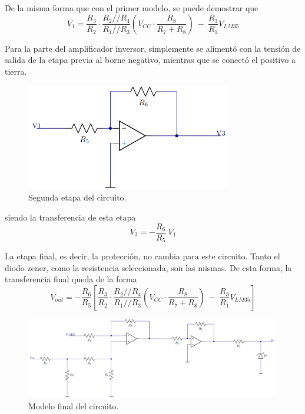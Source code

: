 \documentclass[a4paper]{article}
\begin{document}
De la misma forma que con el primer modelo, se puede demostrar que
\[
	V_1 = \frac{R_3}{R_2} \cdot \frac{R_2 // R_4}{R_1 // R_3} \left( V_{CC} \cdot \frac{R_8}{R_7 + R_8} \right) \ - \ \frac{R_3}{R_1} V_{LM35}
\]

Para la parte del amplificador inversor, simplemente se alimentó con la tensión de salida de la etapa previa al borne negativo, mientras que se conectó el positivo a tierra.

\begin{figure}[H]
	\centering
	\includegraphics[width=0.8\textwidth]{Ejercicio6/Imagenes/CircuitoEtapa2-M2.png}
	\caption{Segunda etapa del circuito.}
	\label{fig:cir2-M2}
\end{figure}

siendo la transferencia de esta etapa
\[
	V_3 = - \frac{R_6}{R_5} \ V_1
\]

La etapa final, es decir, la protección, no cambia para este circuito. Tanto el diodo zener, como la resistencia seleccionada, son las mismas. De esta forma, la transferencia final queda de la forma
\begin{equation}
	V_{out} = - \frac{R_6}{R_5} \left[ \frac{R_3}{R_2} \cdot \frac{R_2 // R_4}{R_1 // R_3} \left( V_{CC} \cdot \frac{R_8}{R_7 + R_8} \right) \ - \ \frac{R_3}{R_1} V_{LM35} \right]
	\label{equ:transfm2}
\end{equation}

\begin{figure}[H]
	\centering
	\includegraphics[width=0.99\textwidth]{Ejercicio6/Imagenes/CircuitoFinal-M2.png}
	\caption{Modelo final del circuito.}
	\label{fig:cirfin-M2}
\end{figure}
\end{document}
